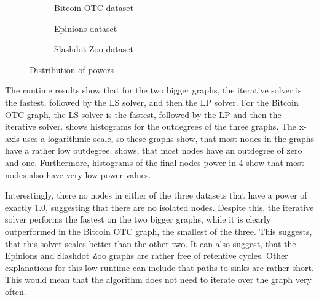 \begin{figure}[t]
    \centering
        \begin{subfigure}[t]{0.30\textwidth}
        \caption{Bitcoin OTC dataset}
        \label{subfig:bitcoinotc_powers}
    \end{subfigure}
    \hfill
        \begin{subfigure}[t]{0.30\textwidth}
        \caption{Epinions dataset}
        \label{subfig:epinions_powers}
    \end{subfigure}
    \hfill
    \begin{subfigure}[t]{0.30\textwidth}
    	\centering
    	\caption{Slashdot Zoo dataset}
	\label{subfig:slashdot_powers}
    \end{subfigure}
    \caption{Distribution of powers}
    \label{fig:datasets_powers}
\end{figure}



The runtime results show that for the two bigger graphs, the iterative solver is the fastest, followed by the LS solver, and then the LP solver. For the Bitcoin OTC graph, the LS solver is the fastest, followed by the LP and then the iterative solver.  shows histograms for the outdegrees of the three graphs. The x-axis uses a logarithmic scale, so these graphs show, that most nodes in the graphs have a rather low outdegree.  shows, that most nodes have an outdegree of zero and one. Furthermore, histograms of the final nodes power in \cref{fig:datasets_powers} show that most nodes also have very low power values. 

Interestingly, there no nodes in either of the three datasets that have a power of exactly 1.0, suggesting that there are no isolated nodes. Despite this, the iterative solver performs the fastest on the two bigger graphs, while it is clearly outperformed in the Bitcoin OTC graph, the smallest of the three. This suggests, that this solver scales better than the other two. It can also suggest, that the Epinions and Slashdot Zoo graphs are rather free of retentive cycles. Other explanations for this low runtime can include that paths to sinks are rather short. This would mean that the algorithm does not need to iterate over the graph very often.  

